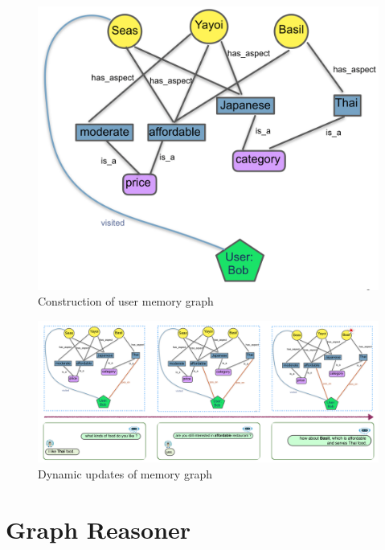\begin{figure}
\centering
\includegraphics[width=5.5in]{fig/acl19_graph.png}
\caption{Construction of user memory graph}
\label{chap5:fig:graph}
\vspace{-15pt}
\end{figure}

\begin{figure}
\centering    
\includegraphics[width=6.0in]{fig/acl19_cum.png}
\caption{Dynamic updates of memory graph}
\label{chap5:fig:cum}
\vspace{-3mm}
\end{figure}

\section{Graph Reasoner}
\label{chap5:sec:umgr}

